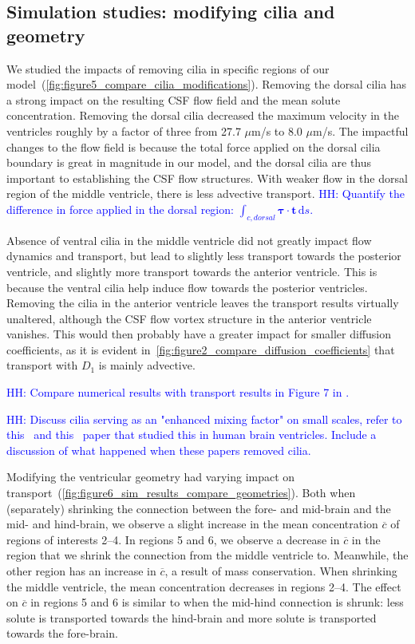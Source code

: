 \documentclass[fleqn]{wlscirep}
\newcommand{\btau}{\bm{\tau}}
\newcommand{\lyng}[1]{\textcolor{blue}{#1}}
\begin{document}
\subsection*{Simulation studies: modifying cilia and geometry}
We studied the impacts of removing cilia in specific regions of our model~(\cref{fig:figure5_compare_cilia_modifications}). Removing the dorsal cilia has a strong impact on the resulting CSF flow field and the mean solute concentration. Removing the dorsal cilia decreased the maximum velocity in the ventricles roughly by a factor of three from 27.7 $\mu$m/s to 8.0 $\mu$m/s. The impactful changes to the flow field is because the total force applied on the dorsal cilia boundary is great in magnitude in our model, and the dorsal cilia are thus important to establishing the CSF flow structures. With weaker flow in the dorsal region of the middle ventricle, there is less advective transport. \lyng{HH: Quantify the difference in force applied in the dorsal region: $\int_{c, dorsal}\btau\cdot\mathbf{t}\,\mathrm ds$.}

Absence of ventral cilia in the middle ventricle did not greatly impact flow dynamics and transport, but lead to slightly less transport towards the posterior ventricle, and slightly more transport towards the anterior ventricle. This is because the ventral cilia help induce flow towards the posterior ventricles. Removing the cilia in the anterior ventricle leaves the transport results virtually unaltered, although the CSF flow vortex structure in the anterior ventricle vanishes. This would then probably have a greater impact for smaller diffusion coefficients, as it is evident in~\cref{fig:figure2_compare_diffusion_coefficients} that transport with $D_1$ is mainly advective.

\lyng{HH: Compare numerical results with transport results in Figure 7 in \cite{Olstad2019CiliaryDevelopment}.}


\lyng{HH: Discuss cilia serving as an "enhanced mixing factor" on small scales, refer to this~\cite{Siyahhan2014FlowVentricles} and this~\cite{Yoshida2022EffectVentricles} paper that studied this in human brain ventricles. Include a discussion of what happened when these papers removed cilia.}

Modifying the ventricular geometry had varying impact on transport~(\cref{fig:figure6_sim_results_compare_geometries}). Both when (separately) shrinking the connection between the fore- and mid-brain and the mid- and hind-brain, we observe a slight increase in the mean concentration $\overline{c}$ of regions of interests 2--4. In regions 5 and 6, we observe a decrease in $\overline{c}$ in the region that we shrink the connection from the middle ventricle to. Meanwhile, the other region has an increase in $\overline{c}$, a result of mass conservation. When shrinking the middle ventricle, the mean concentration decreases in regions 2--4. The effect on $\overline{c}$ in regions 5 and 6 is similar to when the mid-hind connection is shrunk: less solute is transported towards the hind-brain and more solute is transported towards the fore-brain. 
\end{document}
